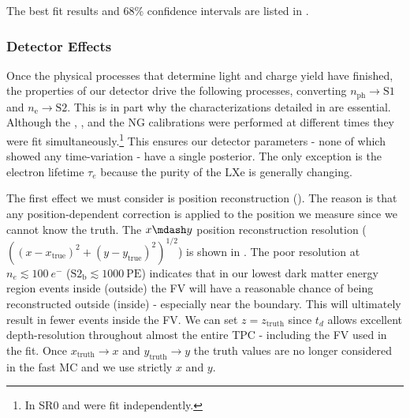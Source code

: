 The best fit results and 68\% confidence intervals are listed in .



\subsubsection{Detector Effects}
\label{subsubsec:er_nr_calibrations_parameter_determ_det_phys}
Once the physical processes that determine light and charge yield have finished, the properties of our detector drive the following
processes, converting $n_{\mathrm{ph}} \rightarrow \mathrm{S1}$ and $n_{\mathrm{e}} \rightarrow \mathrm{S2}$.  This is in part why the
characterizations detailed in  are essential.  Although the , , and the NG calibrations
were performed at different times they were fit simultaneously.\footnote{In SR0  and \ambe were fit independently.}  This
ensures our detector parameters - none of which showed any
time-variation - have a single posterior.  The only exception is the electron lifetime $\tau_e$ because the purity of the LXe is generally
changing.

The first effect we must consider is position reconstruction ().  The reason is that
any position-dependent correction is applied to the position we measure since we cannot know the truth.  The $x \mdash y$ position
reconstruction resolution ($((x - x_{\mathrm{true}})^2 + (y - y_{\mathrm{true}})^2)^{1/2}$) is shown in
.  The poor resolution at
$n_e \lesssim 100\ e^-$ ($\mathrm{S2_b} \lesssim 1000\ \mathrm{PE}$) indicates that in our lowest dark matter energy region events inside
(outside) the FV will have a reasonable chance of being reconstructed outside (inside) - especially near the boundary.  This will
ultimately result in fewer events inside the FV.  We can set $z = z_{\mathrm{truth}}$ since $t_d$ allows excellent depth-resolution
throughout almost the entire TPC - including the FV used in the fit.  Once $x_{\mathrm{truth}} \rightarrow x$ and
$y_{\mathrm{truth}} \rightarrow y$ the truth values are no longer considered in the fast MC and we use strictly $x$ and $y$.


